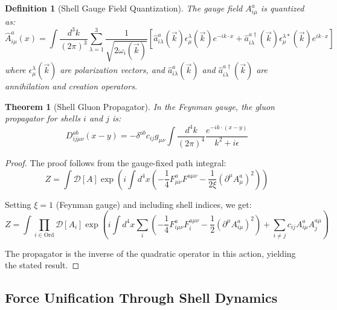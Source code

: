 \documentclass[12pt,a4paper]{article}
\newtheorem{theorem}{Theorem}[section]
\newtheorem{definition}{Definition}[section]
\newcommand{\D}{\mathcal{D}}
\begin{document}
\begin{definition}[Shell Gauge Field Quantization]
\label{def:gauge-quantization}
The gauge field $A_{i\mu}^a$ is quantized as:
\begin{equation}
\hat{A}_{i\mu}^a(x) = \int \frac{d^3k}{(2\pi)^3} \sum_{\lambda=1}^3 \frac{1}{\sqrt{2\omega_i(\vec{k})}} \left[\hat{a}_{i\lambda}^a(\vec{k})\epsilon_{\mu}^{\lambda}(\vec{k})e^{-ik \cdot x} + \hat{a}_{i\lambda}^{a\dagger}(\vec{k})\epsilon_{\mu}^{\lambda*}(\vec{k})e^{ik \cdot x}\right]
\end{equation}
where $\epsilon_{\mu}^{\lambda}(\vec{k})$ are polarization vectors, and $\hat{a}_{i\lambda}^a(\vec{k})$ and $\hat{a}_{i\lambda}^{a\dagger}(\vec{k})$ are annihilation and creation operators.
\end{definition}

\begin{theorem}[Shell Gluon Propagator]
\label{thm:gluon-propagator}
In the Feynman gauge, the gluon propagator for shells $i$ and $j$ is:
\begin{equation}
D_{ij\mu\nu}^{ab}(x-y) = -\delta^{ab} c_{ij} g_{\mu\nu} \int \frac{d^4k}{(2\pi)^4} \frac{e^{-ik \cdot (x-y)}}{k^2 + i\epsilon}
\end{equation}
\end{theorem}

\begin{proof}
The proof follows from the gauge-fixed path integral:
\begin{equation}
Z = \int \D[A] \exp\left(i\int d^4x \left(-\frac{1}{4}F_{\mu\nu}^a F^{a\mu\nu} - \frac{1}{2\xi}(\partial^\mu A_\mu^a)^2\right)\right)
\end{equation}

Setting $\xi = 1$ (Feynman gauge) and including shell indices, we get:
\begin{equation}
Z = \int \prod_{i \in \text{Ord}} \D[A_i] \exp\left(i\int d^4x \sum_i \left(-\frac{1}{4}F_{i\mu\nu}^a F_i^{a\mu\nu} - \frac{1}{2}(\partial^\mu A_{i\mu}^a)^2\right) + \sum_{i \neq j} c_{ij} A_{i\mu}^a A_j^{a\mu}\right)
\end{equation}

The propagator is the inverse of the quadratic operator in this action, yielding the stated result.
\end{proof}

\subsection{Force Unification Through Shell Dynamics}
\label{subsec:force-unification}
\end{document}
